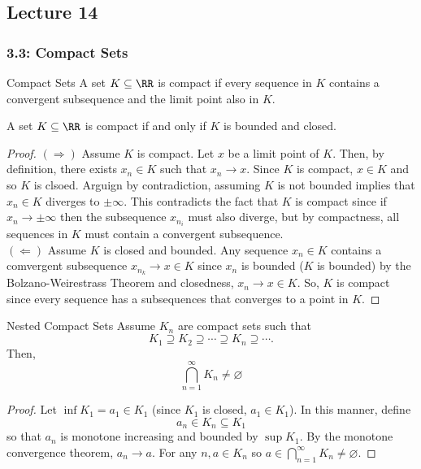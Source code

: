 \subsection{Lecture 14}
\subsubsection{3.3: Compact Sets}
\begin{defbox}{Compact Sets}{}{}
    A set $K \subseteq \RR$ is compact if every sequence in $K$ contains a convergent subsequence and the limit point also in $K$.
\end{defbox}

\begin{thm}{}{}
    A set $K \subseteq \RR$ is compact if and only if $K$ is bounded and closed.
    
    \begin{proof}
        $(\Rightarrow)$ Assume $K$ is compact. Let $x$ be a limit point of $K$. Then, by definition, there exists $x_n \in K$ such that $x_n \to x$. Since $K$ is compact, $x \in K$ and so $K$ is clsoed. Arguign by contradiction, assuming $K$ is not bounded implies that $x_n \in K$ diverges to $\pm\infty$. This contradicts the fact that $K$ is compact since if $x_n \to \pm\infty$ then the subsequence $x_{n_{i}}$ must also diverge, but by compactness, all sequences in $K$ must contain a convergent subsequence. \\
        $(\Leftarrow)$ Assume $K$ is closed and bounded. Any sequence $x_n \in K$ contains a comvergent subsequence $x_{n_k} \to x \in K$ since $x_n$ is bounded ($K$ is bounded) by the Bolzano-Weirestrass Theorem and closedness, $x_n \to x \in K$. So, $K$ is compact since every sequence has a subsequences that converges to a point in $K$.
    \end{proof}
\end{thm}

\begin{thm}{Nested Compact Sets}{}
    Assume $K_n$ are compact sets such that 
    \[
        K_1 \supseteq K_2 \supseteq \cdots \supseteq K_n \supseteq \cdots.
    \]
    Then, 
    \[
        \bigcap_{n=1}^{\infty} K_n \neq \varnothing 
    \]

    \begin{proof}
        Let $\inf K_1 = a_1 \in K_1$ (since $K_1$ is closed, $a_1 \in K_1$). In this manner, define 
        \[
            a_n \in K_n \subseteq K_1 
        \]
        so that $a_n$ is monotone increasing and bounded by $\sup K_1$. By the monotone convergence theorem, $a_n \to a$. For any $n, a \in K_n$ so $a \in \bigcap_{n=1}^{\infty} K_n \neq \varnothing$.
    \end{proof}
\end{thm}

